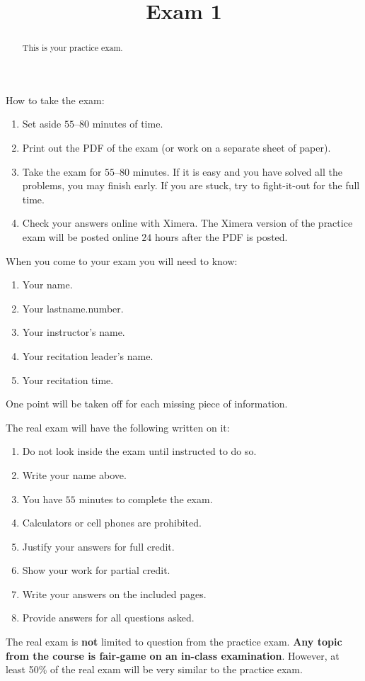 \documentclass{ximera}
\title{Exam 1}
\begin{document}
\begin{abstract}
This is your practice exam.
\end{abstract}
\maketitle

How to take the exam:
\begin{enumerate}
  \item Set aside $55$--$80$ minutes of time.
  \item Print out the PDF of the exam (or work on a separate sheet of paper).
  \item Take the exam for $55$--$80$ minutes. If it is easy and you have
    solved all the problems, you may finish early. If you are stuck,
    try to fight-it-out for the full time.
  \item Check your answers online with Ximera. The Ximera version of
    the practice exam will be posted online $24$ hours after the PDF is
    posted.
\end{enumerate}


When you come to your exam you will need to know:
\begin{enumerate}
\item Your name.
\item Your lastname.number.
\item Your instructor's name.
\item Your recitation leader's name.
\item Your recitation time.
\end{enumerate}
One point will be taken off for each missing piece of information.

The real exam will have the following written on it:

\begin{enumerate}
\item Do not look inside the exam until instructed to do so.
\item Write your name above.
\item You have $55$ minutes to complete the exam.
\item Calculators or cell phones are prohibited.
\item Justify your answers for full credit.
\item Show your work for partial credit.
\item Write your answers on the included pages.
\item Provide answers for all questions asked.
\end{enumerate}

The real exam is \textbf{not} limited to question from the practice
exam. \textbf{Any topic from the course is fair-game on an in-class
  examination}.  However, at least 50\% of the real exam will be very
similar to the practice exam.
\end{document}
